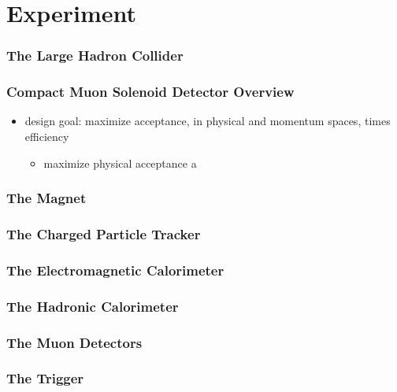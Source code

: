 \chapter{Experiment}
\label{experiment_chapter}
\subsection{The Large Hadron Collider}


\subsection{Compact Muon Solenoid Detector Overview}
\begin{itemize}
	\item design goal: maximize acceptance, in physical and momentum spaces, times efficiency
		\begin{itemize}
			\item maximize physical acceptance a
		\end{itemize}
\end{itemize}


\subsection{The Magnet}

\subsection{The Charged Particle Tracker}

\subsection{The Electromagnetic Calorimeter}

\subsection{The Hadronic Calorimeter}

\subsection{The Muon Detectors}

\subsection{The Trigger}



